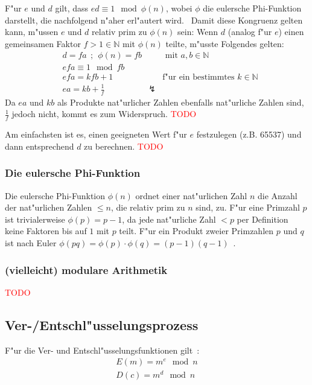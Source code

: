 \documentclass[12pt]{article}
\newcommand{\todo}[1]{\textcolor{red}{\mbox{TODO}}\marginpar{\textcolor{red}{#1}}}
\begin{document}
F"ur $e$ und $d$ gilt, dass $ed \equiv 1 \mod \phi(n)$,
wobei $\phi$ die eulersche Phi-Funktion darstellt, die nachfolgend n"aher erl"autert wird.~\cite{rsa}
Damit diese Kongruenz gelten kann, m"ussen $e$ und $d$ relativ prim zu $\phi(n)$ sein:
Wenn $d$ (analog f"ur $e$) einen gemeinsamen Faktor $f > 1 \in \mathbb{N}$ mit $\phi(n)$ teilte, m"usste Folgendes gelten:
\[
\begin{aligned}
&d = fa ~~;~~ \phi(n) = fb && \textrm{ mit } a, b \in \mathbb{N} \\
&efa \equiv 1 \mod fb \\
&efa = kfb + 1 && \textrm{f"ur ein bestimmtes } k \in \mathbb{N} \\
&ea = kb + \frac{1}{f} & \lightning &
\end{aligned}
\]
Da $ea$ und $kb$ als Produkte nat"urlicher Zahlen ebenfalls nat"urliche Zahlen sind, $\frac{1}{f}$ jedoch nicht, kommt es zum Widerspruch. \todo{Ist das so OK?}

Am einfachsten ist es, einen geeigneten Wert f"ur $e$ festzulegen (z.B. 65537)
und dann entsprechend $d$ zu berechnen.
\todo{Erkl"aren, wie man es berechnet? (erweiterter euklidischer Algorithmus)}

\subsubsection{Die eulersche Phi-Funktion}
Die eulersche Phi-Funktion $\phi(n)$ ordnet einer nat"urlichen Zahl $n$ die Anzahl der nat"urlichen Zahlen $\leq n$,
die relativ prim zu $n$ sind, zu.
F"ur eine Primzahl $p$ ist trivialerweise $\phi(p) = p-1$,
da jede nat"urliche Zahl $<p$ per Definition keine Faktoren bis auf $1$ mit $p$ teilt.
F"ur ein Produkt zweier Primzahlen $p$ und $q$ ist nach Euler
$\phi(pq) = \phi(p) \cdot \phi(q) = (p-1)(q-1)$~\cite{euler63}.

\subsubsection{(vielleicht) modulare Arithmetik}
\todo{Eher in den Anhang?}
\subsection{Ver-/Entschl"usselungsprozess}
F"ur die Ver- und Entschl"usselungsfunktionen gilt~\cite{rsa}:
\[
\begin{aligned}
E(m) = m^e \mod n \\
D(c) = m^d \mod n
\end{aligned}
\]
\end{document}
